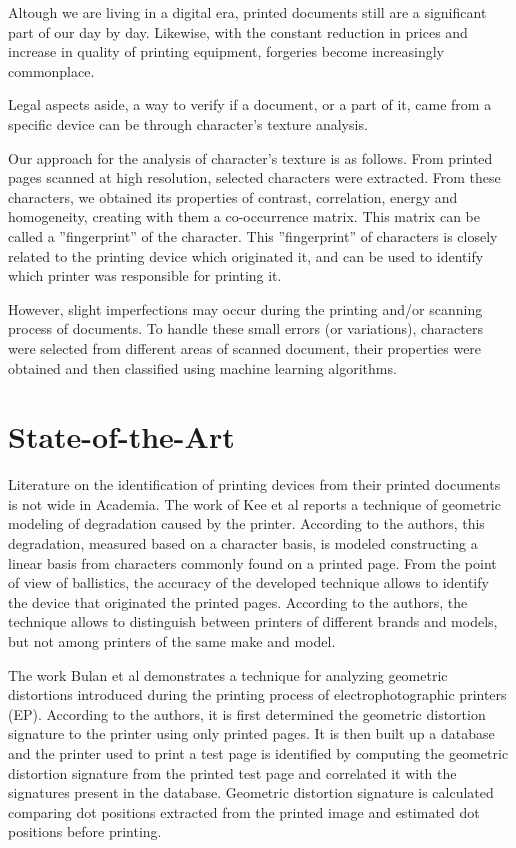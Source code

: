 \documentclass[10pt,twocolumn,letterpaper]{article}
\begin{document}
Altough we are living in a digital era, printed documents still are a significant part of our day by day. Likewise, with the constant reduction in prices and increase in quality of printing equipment, forgeries become increasingly commonplace.

Legal aspects aside, a way to verify if a document, or a part of it, came from a specific device can be through  character's texture analysis.

Our approach for the analysis of character's texture is as follows. From printed pages scanned at high resolution, selected characters were extracted. From these characters, we obtained its properties of contrast, correlation, energy and homogeneity, creating with them a co-occurrence matrix. This matrix can be called a ''fingerprint'' of the character. This ''fingerprint'' of  characters is closely related to the printing device which originated it, and can be used to identify which printer was responsible for printing it.

However, slight imperfections may occur during the printing and/or scanning process of documents. To handle these small errors (or variations), characters were selected from different areas of scanned document, their properties were obtained and then classified using machine learning algorithms.

\section{State-of-the-Art}
\label{sec:state_of_the_art}

Literature on the identification of printing devices from their printed documents is not wide in Academia. The work of Kee et al \cite{Printer_Profiling} reports a technique of geometric modeling of degradation caused by the printer. According to the authors, this degradation, measured based on a character basis, is modeled constructing a linear basis from characters commonly found on a printed page. From the point of view of ballistics, the accuracy of the developed technique allows to identify the device that originated the printed pages. According to the authors, the technique allows to distinguish between printers of different brands and models, but not among printers of the same make and model.

The work Bulan et al \cite{Bulan} demonstrates a technique for analyzing geometric distortions introduced during the printing process of electrophotographic printers (EP). According to the authors, it is first determined the geometric distortion signature to the printer using only printed pages. It is then built up a database and the printer used to print a test page is identified by computing the geometric distortion signature from the printed test page and correlated it with the signatures present in the database. Geometric distortion signature is calculated comparing dot positions extracted from the printed image and estimated dot positions before printing.
\end{document}
